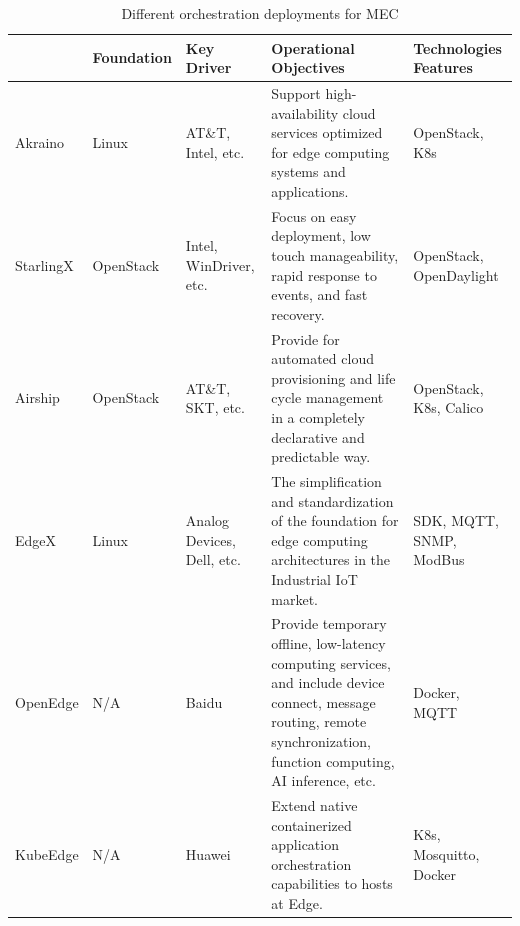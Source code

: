 \begin{table}

\caption{Different orchestration deployments for MEC}
\label{table:mec-frameworks}

\begin{turn}{90}

    \begin{tabular}{ | p{2cm} | p{2cm} | p{2.5cm} | p{8cm} | p{2.5cm} | }
    \hline
      & Foundation & Key Driver & Operational Objectives & Technologies Features\\ \hline
    Akraino & Linux & AT\&T, Intel, etc. & Support high-availability cloud services optimized for edge computing systems and applications. & OpenStack, K8s \\ \hline

    StarlingX & OpenStack & Intel, WinDriver, etc. & Focus on easy deployment, low touch manageability, rapid response to events, and fast recovery. & OpenStack, OpenDaylight \\ \hline

    Airship & OpenStack &  AT\&T, SKT, etc. & Provide for automated cloud provisioning and life cycle management in a completely declarative and predictable way. & OpenStack, K8s, Calico \\ \hline

    EdgeX & Linux & Analog Devices, Dell, etc. & The simplification and standardization of the foundation for edge computing architectures in the Industrial IoT market. & SDK, MQTT, SNMP, ModBus \\ \hline

    OpenEdge & N/A & Baidu & Provide temporary offline, low-latency computing services, and include device connect, message routing, remote synchronization, function computing, AI inference, etc. & Docker, MQTT \\ \hline

    KubeEdge & N/A & Huawei & Extend native containerized application orchestration capabilities to hosts at Edge. & K8s, Mosquitto, Docker \\ \hline



\end{tabular}
\end{turn}
\end{table}
